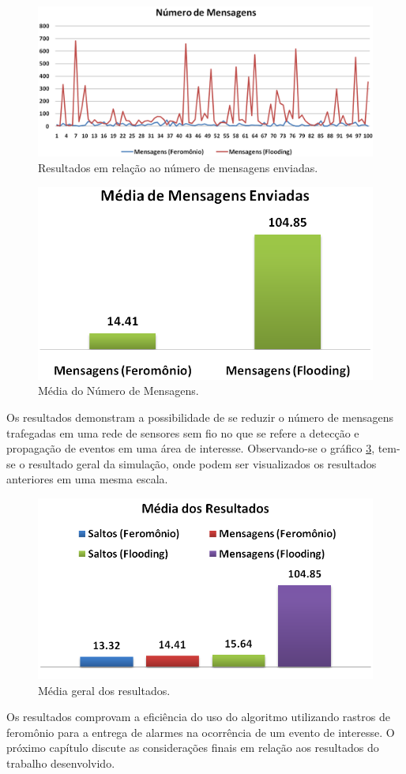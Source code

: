  \begin{figure}[h!]
 \centering
 \includegraphics[width=13cm]{results/messages.png}
 \caption{Resultados em relação ao número de mensagens enviadas.}
  \label{fig:messages}
 \end{figure}

 \begin{figure}[h!]
 \centering
 \includegraphics{results/messages_mean.png}
 \caption{Média do Número de Mensagens.}
  \label{fig:messages_mean}
 \end{figure}

Os resultados demonstram a possibilidade de se reduzir o número de mensagens trafegadas em uma rede de sensores sem fio no que se refere a detecção e propagação de eventos em uma área de interesse. Observando-se o gráfico \ref{fig:global_mean}, tem-se o resultado geral da simulação, onde podem ser visualizados os resultados anteriores em uma mesma escala.

\begin{figure}[h!]
 \centering
 \includegraphics{results/global_mean.png}
 \caption{Média geral dos resultados.}
  \label{fig:global_mean}
 \end{figure}

Os resultados comprovam a eficiência do uso do algoritmo utilizando rastros de feromônio para a entrega de alarmes na ocorrência de um evento de interesse. O próximo capítulo discute as considerações finais em relação aos resultados do trabalho desenvolvido.